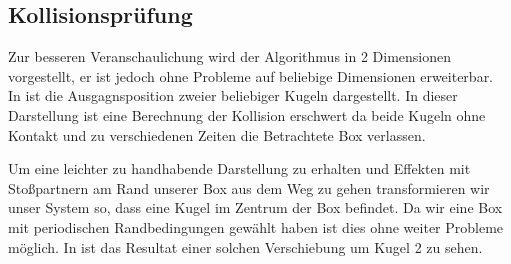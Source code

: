 \subsection{Kollisionsprüfung} %

\newcommand{\BoxW}{10}
\newcommand{\BoxH}{7}
\newcommand{\Kradius}{.7}

\newcommand{\Kx}{7}
\newcommand{\Ky}{6}

\newcommand{\vxa}{6/3}
\newcommand{\vya}{2/3}
\newcommand{\vxb}{-5/3}
\newcommand{\vyb}{3/3}

\newcommand{\Dx}{-2.5}
\newcommand{\Dy}{-5}

\newcommand{\BoxC}{\BoxW / 2 , \BoxH / 2}
\newcommand{\BoxWh}{\BoxW / 2}
\newcommand{\BoxHh}{\BoxH / 2}

\newcommand{\drawKugel}[1]{
    \draw[fill=black] 	(#1) circle (0.15em);
    \draw		(#1) circle (\Kradius);
}

\newcommand{\dis}{r_{21}}
\newcommand{\vdis}{\vec{r}_{21}}
\newcommand{\vdissq}{\left|\vdis\right|^2}

\newcommand{\vel}{v_{21}}
\newcommand{\vvel}{\vec{v}_{21}}
\newcommand{\vvelsq}{\left|\vvel\right|^2}
\newcommand{\dia}{d}

Zur besseren Veranschaulichung wird der Algorithmus in 2 Dimensionen vorgestellt, er ist jedoch ohne Probleme auf beliebige Dimensionen erweiterbar.\\
In  ist die Ausgagnsposition zweier beliebiger Kugeln dargestellt. In dieser Darstellung ist eine Berechnung der Kollision erschwert da beide Kugeln ohne Kontakt und zu verschiedenen Zeiten die Betrachtete Box verlassen.



Um eine leichter zu handhabende Darstellung zu erhalten und Effekten mit Stoßpartnern am Rand unserer Box aus dem Weg zu gehen transformieren wir unser System so, dass eine Kugel im Zentrum der Box befindet. Da wir eine Box mit periodischen Randbedingungen gewählt haben ist dies ohne weiter Probleme möglich. In  ist das Resultat einer solchen Verschiebung um Kugel 2 zu sehen.



